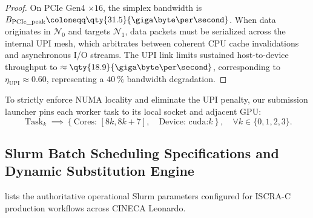 \begin{proof}
  On PCIe Gen4 $\times 16$, the simplex bandwidth is
  $B_{\mathrm{PCIe\_peak}} \coloneqq \qty{31.5}{\giga\byte\per\second}$.
  When data originates in $\mathcal{N}_0$ and targets
  $\mathcal{N}_1$, data packets must be serialized
  across the internal UPI mesh, which arbitrates between coherent
  CPU cache invalidations and
  asynchronous I/O streams. The UPI link limits sustained
  host-to-device throughput to
  $\approx \qty{18.9}{\giga\byte\per\second}$, corresponding to
  $\eta_{\mathrm{UPI}} \approx \num{0.60}$,
  representing a $\qty{40}{\percent}$ bandwidth degradation.
\end{proof}

To strictly enforce NUMA locality and eliminate the UPI penalty, our
submission launcher
pins each worker task to its local socket and adjacent GPU:
\begin{equation}
  \operatorname{Task}_k \implies \left\{ \text{Cores: } [8k, 8k+7],
  \quad \text{Device: } \text{cuda:}k \right\}, \quad \forall k \in
  \{0, 1, 2, 3\}.
  \label{eq:supp_pinning_rule}
\end{equation}


\subsection*{Slurm Batch Scheduling Specifications and Dynamic
Substitution Engine}
\label{subsec:supp_slurm_specifications}

 lists the authoritative operational
Slurm parameters configured
for ISCRA-C production workflows across CINECA Leonardo.

